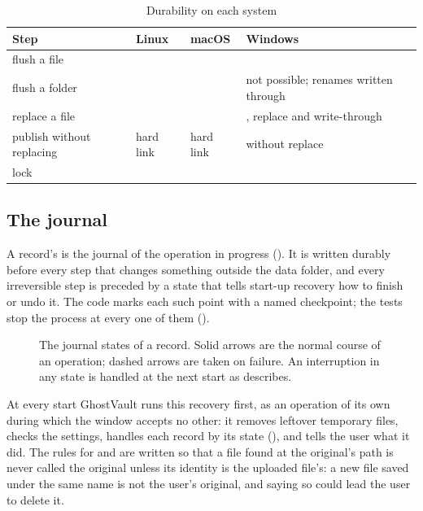 \begin{table}[t]
\caption{Durability on each system}\label{tab:durable}
\centering\footnotesize
\setlength{\tabcolsep}{4pt}
\begin{tabular}{@{}L{17mm}L{17mm}L{19mm}L{24mm}@{}}
\toprule
\textbf{Step} & \textbf{Linux} & \textbf{macOS} & \textbf{Windows} \\
\midrule
flush a file &  &  &  \\ \addlinespace[1.6pt]
flush a folder &  &  & not possible; renames written through \\ \addlinespace[1.6pt]
replace a file &  &  & , replace and write-through \\ \addlinespace[1.6pt]
publish without replacing & hard link & hard link &  without replace \\ \addlinespace[1.6pt]
lock &  &  &  \\
\bottomrule
\end{tabular}
\end{table}

\subsection{The journal}\label{sec:journal}
A record's  is the journal of the operation in progress (). It is
written durably before every step that changes something outside the data folder, and every
irreversible step is preceded by a state that tells start-up recovery how to finish or undo it.
The code marks each such point with a named checkpoint; the tests stop the process at every one of
them ().

\begin{figure}[t]
\centering

\caption{The journal states of a record. Solid arrows are the normal course of an operation;
dashed arrows are taken on failure. An interruption in any state is handled at the next start as
 describes.}
\label{fig:journal}
\end{figure}

At every start GhostVault runs this recovery first, as an operation of its own during which the
window accepts no other: it removes leftover temporary files, checks the settings, handles each
record by its state (), and tells the user what it did. The rules
for  and  are written so that a file found at the original's
path is never called the original unless its identity is the uploaded file's: a new file saved under
the same name is not the user's original, and saying so could lead the user to delete it.

